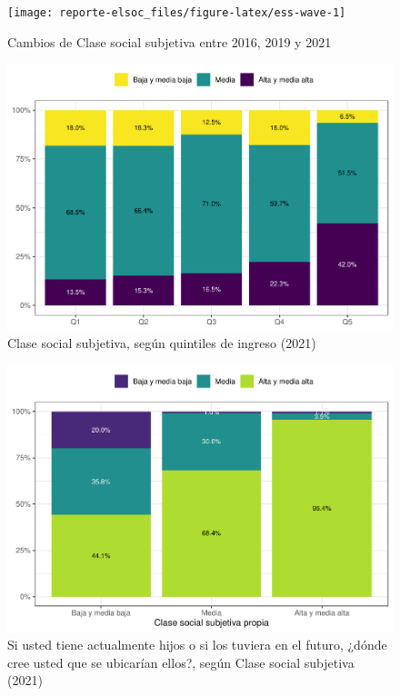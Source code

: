 \documentclass[
  12pt,
  openany]{book}
\begin{document}
\begin{figure}

{\centering \texttt{[image: reporte-elsoc\_files/figure-latex/ess-wave-1]} 

}

\caption{Cambios de Clase social subjetiva entre 2016, 2019 y 2021}\label{fig:ess-wave}
\end{figure}

\begin{figure}

{\centering \includegraphics{reporte-elsoc_files/figure-latex/ess-quintil-1} 

}

\caption{Clase social subjetiva, según quintiles de ingreso (2021)}\label{fig:ess-quintil}
\end{figure}

\begin{figure}

{\centering \includegraphics{reporte-elsoc_files/figure-latex/esshijos-ess-1} 

}

\caption{Si usted tiene actualmente hijos o si los tuviera en el futuro, ¿dónde cree usted que se ubicarían ellos?, según Clase social subjetiva (2021)}\label{fig:esshijos-ess}
\end{figure}
\end{document}
